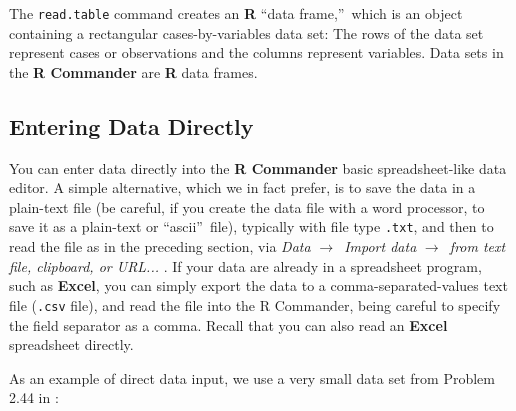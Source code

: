 \documentclass{article}%
\begin{document}
The \texttt{read.table} command creates an \textbf{R} \textquotedblleft data
frame,\textquotedblright\ which is an object containing a rectangular
cases-by-variables data set: The rows of the data set represent cases or
observations and the columns represent variables. Data sets in the \textbf{R
Commander} are \textbf{R} data frames.

\subsection{Entering Data Directly}

You can enter data directly into the
\textbf{R Commander} basic spreadsheet-like data editor. A simple
alternative, which we in fact prefer, is to save the data in a plain-text file
(be careful, if you create the data file with a word processor, to save it as
a plain-text or \textquotedblleft ascii\textquotedblright\ file), typically
with file type \texttt{.txt}, and then to read the file as in the preceding
section, via \emph{Data }$\longrightarrow$\emph{\ Import data }%
$\longrightarrow$\emph{\ from text file, clipboard, or URL...} . If your data
are already in a spreadsheet program, such as \textbf{Excel}, you can simply
export the data to a comma-separated-values text file (\texttt{.csv} file),
and read the file into the R Commander, being careful to specify the
field separator as a comma. Recall that you can also
read an \textbf{Excel} spreadsheet directly.

As an example of direct data input, we use a very small data set from Problem
2.44 in \citet{Moore00}:
\end{document}
